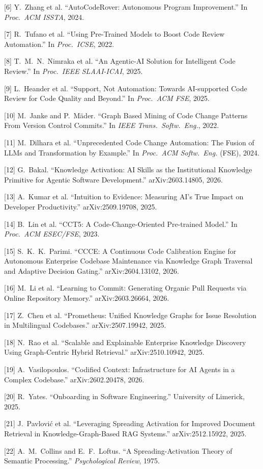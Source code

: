 \documentclass[11pt, letterpaper]{article}
\begin{document}
[6] Y.~Zhang et al. ``AutoCodeRover: Autonomous Program Improvement.'' In \textit{Proc.\ ACM ISSTA}, 2024.

[7] R.~Tufano et al. ``Using Pre-Trained Models to Boost Code Review Automation.'' In \textit{Proc.\ ICSE}, 2022.

[8] T.~M.~N.~Nimraka et al. ``An Agentic-AI Solution for Intelligent Code Review.'' In \textit{Proc.\ IEEE SLAAI-ICAI}, 2025.

[9] L.~Heander et al. ``Support, Not Automation: Towards AI-supported Code Review for Code Quality and Beyond.'' In \textit{Proc.\ ACM FSE}, 2025.

[10] M.~Janke and P.~M\"ader. ``Graph Based Mining of Code Change Patterns From Version Control Commits.'' In \textit{IEEE Trans.\ Softw.\ Eng.}, 2022.

[11] M.~Dilhara et al. ``Unprecedented Code Change Automation: The Fusion of LLMs and Transformation by Example.'' In \textit{Proc.\ ACM Softw.\ Eng.} (FSE), 2024.

[12] G.~Bakal. ``Knowledge Activation: AI Skills as the Institutional Knowledge Primitive for Agentic Software Development.'' arXiv:2603.14805, 2026.

[13] A.~Kumar et al. ``Intuition to Evidence: Measuring AI's True Impact on Developer Productivity.'' arXiv:2509.19708, 2025.

[14] B.~Lin et al. ``CCT5: A Code-Change-Oriented Pre-trained Model.'' In \textit{Proc.\ ACM ESEC/FSE}, 2023.

[15] S.~K.~K.~Parimi. ``CCCE: A Continuous Code Calibration Engine for Autonomous Enterprise Codebase Maintenance via Knowledge Graph Traversal and Adaptive Decision Gating.'' arXiv:2604.13102, 2026.

[16] M.~Li et al. ``Learning to Commit: Generating Organic Pull Requests via Online Repository Memory.'' arXiv:2603.26664, 2026.

[17] Z.~Chen et al. ``Prometheus: Unified Knowledge Graphs for Issue Resolution in Multilingual Codebases.'' arXiv:2507.19942, 2025.

[18] N.~Rao et al. ``Scalable and Explainable Enterprise Knowledge Discovery Using Graph-Centric Hybrid Retrieval.'' arXiv:2510.10942, 2025.

[19] A.~Vasilopoulos. ``Codified Context: Infrastructure for AI Agents in a Complex Codebase.'' arXiv:2602.20478, 2026.

[20] R.~Yates. ``Onboarding in Software Engineering.'' University of Limerick, 2025.

[21] J.~Pavlovi\'c et al. ``Leveraging Spreading Activation for Improved Document Retrieval in Knowledge-Graph-Based RAG Systems.'' arXiv:2512.15922, 2025.

[22] A.~M.~Collins and E.~F.~Loftus. ``A Spreading-Activation Theory of Semantic Processing.'' \textit{Psychological Review}, 1975.
\end{document}

